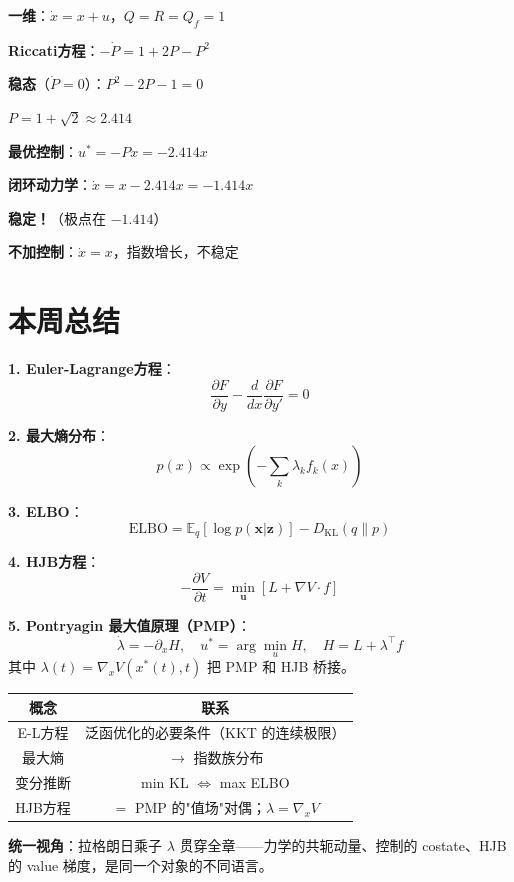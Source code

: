 \documentclass[12pt, a4paper]{ctexart}
\begin{document}
\begin{blackboard}[LQR数值例子]

\textbf{一维}：$\dot{x} = x + u$，$Q = R = Q_f = 1$

\textbf{Riccati方程}：$-\dot{P} = 1 + 2P - P^2$

\textbf{稳态}（$\dot{P} = 0$）：$P^2 - 2P - 1 = 0$

$P = 1 + \sqrt{2} \approx 2.414$

\textbf{最优控制}：$u^* = -Px = -2.414x$

\textbf{闭环动力学}：$\dot{x} = x - 2.414x = -1.414x$

\textbf{稳定！}（极点在 $-1.414$）

\textbf{不加控制}：$\dot{x} = x$，指数增长，不稳定

\end{blackboard}

\section{本周总结}

\begin{keypoint}[核心公式]

\textbf{1. Euler-Lagrange方程}：
\[
\frac{\partial F}{\partial y} - \frac{d}{dx}\frac{\partial F}{\partial y'} = 0
\]

\textbf{2. 最大熵分布}：
\[
p(x) \propto \exp\left( -\sum_k \lambda_k f_k(x) \right)
\]

\textbf{3. ELBO}：
\[
\text{ELBO} = \mathbb{E}_q[\log p(\mathbf{x}|\mathbf{z})] - D_{\text{KL}}(q \| p)
\]

\textbf{4. HJB方程}：
\[
-\frac{\partial V}{\partial t} = \min_{\mathbf{u}} \left[ L + \nabla V \cdot f \right]
\]

\textbf{5. Pontryagin 最大值原理（PMP）}：
\[
\dot\lambda = -\partial_x H,\quad u^* = \arg\min_u H,\quad H = L + \lambda^\top f
\]
其中 $\lambda(t) = \nabla_x V(x^*(t), t)$ 把 PMP 和 HJB 桥接。

\end{keypoint}

\begin{keypoint}[核心联系]

\begin{center}
\begin{tabular}{c|c}
概念 & 联系 \\
\hline
E-L方程 & 泛函优化的必要条件（KKT 的连续极限） \\
最大熵 & $\to$ 指数族分布 \\
变分推断 & min KL $\Leftrightarrow$ max ELBO \\
HJB方程 & $=$ PMP 的"值场"对偶；$\lambda = \nabla_x V$
\end{tabular}
\end{center}

\textbf{统一视角}：拉格朗日乘子 $\lambda$ 贯穿全章——力学的共轭动量、控制的 costate、HJB 的 value 梯度，是同一个对象的不同语言。

\end{keypoint}
\end{document}
